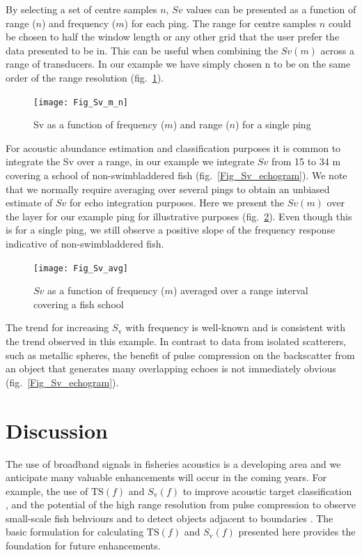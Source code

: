 \documentclass[preprint,12pt,TurnOnLineNumbers]{JASAnew}
\newcommand{\freqsym}{f}
\newcommand{\ts}{\textrm{TS}}
\newcommand{\sv}{S_{\textrm{v}}}
\begin{document}
By selecting a set of centre samples $n$, $Sv$ values can be presented as a function of range ($n$) and frequency ($m$) for each ping. The range for centre samples $n$ could be chosen to half the window length or any other grid that the user prefer the data presented to be in. This can be useful when combining the $Sv(m)$ across a range of transducers. In our example we have simply chosen n to be on the same order of the range resolution (fig.~\ref{Fig_Sv_m_n}).

\begin{figure}
\texttt{[image: Fig\_Sv\_m\_n]}
\caption{\label{Fig_Sv_m_n} Sv as a function of frequency ($m$) and range ($n$) for a single ping}
\end{figure}

For acoustic abundance estimation and classification purposes it is common to integrate the Sv over a range, in our example we integrate $Sv$ from 15 to 34 m covering a school of non-swimbladdered fish (fig.~\ref{Fig_Sv_echogram}). We note that we normally require averaging over several pings to obtain an unbiased estimate of $Sv$ for echo integration purposes. Here we present the $Sv(m)$ over the layer for our example ping for illustrative purposes (fig.~\ref{Fig_Sv_avg}). Even though this is for a single ping, we still observe a positive slope of the frequency response indicative of non-swimbladdered fish. 

\begin{figure}
\texttt{[image: Fig\_Sv\_avg]}
\caption{\label{Fig_Sv_avg} $Sv$ as a function of frequency ($m$) averaged over a range interval covering a fish school }
\end{figure}

The trend for increasing $\sv$ with frequency is well-known \citep{korneliussen2010} and is consistent with the trend observed in this example. In contrast to data from isolated scatterers, such as metallic spheres, the benefit of pulse compression on the backscatter from an object that generates many overlapping echoes is not immediately obvious (fig.~\ref{Fig_Sv_echogram}).

\section{Discussion}
The use of broadband signals in fisheries acoustics is a developing area and we anticipate many valuable enhancements will occur in the coming years. For example, the use of $\ts(\freqsym)$ and $\sv(\freqsym)$ to improve acoustic target classification \citep{bassettBroadbandEchosounderMeasurements2018, korneliussen2018}, and the potential of the high range resolution from pulse compression to observe small-scale fish behviours \citep{skaret2020} and to detect objects adjacent to boundaries \citep{lavery2017}. The basic formulation for calculating $\ts(\freqsym)$ and $\sv(\freqsym)$ presented here provides the foundation for future enhancements.
\end{document}

